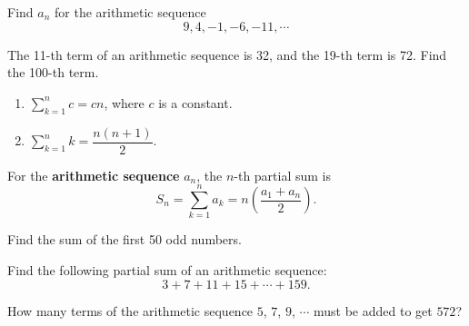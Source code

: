 \begin{example}
    Find $a_n$ for the arithmetic sequence
    \[9,4,-1,-6,-11,\cdots\]
\end{example}

\begin{example}
The 11-th term of an arithmetic sequence is 32, and the 19-th term is 72. Find the 100-th term.
\end{example}

        \begin{theorem}\mbox{}
    \begin{enumerate}
        \item $\sum\limits_{k=1}^n c=cn$, where $c$ is a constant.
        \item $\sum\limits_{k=1}^n k=\dfrac{n(n+1)}{2}$.
    \end{enumerate}
\end{theorem}

\newpage

\begin{theorem}
    For the \textbf{arithmetic sequence} $a_n$, the $n$-th partial sum is
    \[S_n=\sum\limits_{k=1}^n a_k=n\left(\dfrac{a_1+a_n}{2}\right).\]
\end{theorem}

\begin{example}
    Find the sum of the first 50 odd numbers.
\end{example}

\begin{example}
    Find the following partial sum of an arithmetic sequence:
    \[3+7+11+15+\cdots+159.\]
\end{example}

\begin{example}
    How many terms of the arithmetic sequence $5$, $7$, $9$, $\cdots$ must be added to get $572$?
\end{example}


